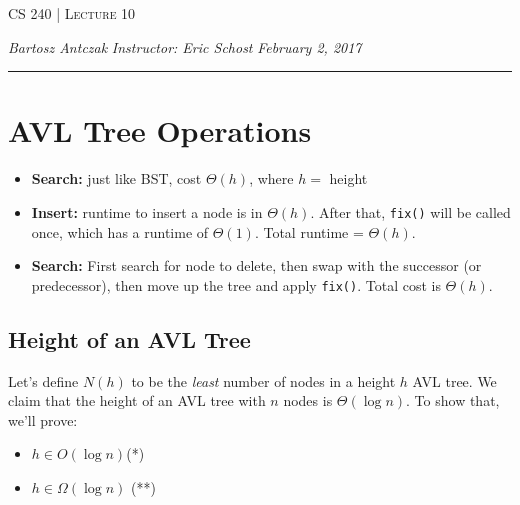 \documentclass{report}
\newcommand{\lectureNum}{10}
\newcommand{\curDate}{February 2, 2017}
\newcommand{\course}{CS 240}
\begin{document}
\begin{center}
\begin{Large}
\textsc{\course{} | Lecture \lectureNum{}}
\end{Large}
\end{center} 
\noindent \textit{Bartosz Antczak} \hfill
\textit{Instructor: Eric Schost} \hfill
\textit{\curDate{}}
\rule{\textwidth}{0.4pt}

\section{AVL Tree Operations}
\begin{itemize}
\item \textbf{Search:} just like BST, cost $\Theta(h)$, where $h = $ height
\item \textbf{Insert:} runtime to insert a node is in $\Theta(h)$. After that, \texttt{fix()} will be called once, which has a runtime of $\Theta(1)$. Total runtime = $\Theta(h)$.
\item \textbf{Search:} First search for node to delete, then swap with the successor (or predecessor), then move up the tree and apply \texttt{fix()}. Total cost is $\Theta(h)$.
\end{itemize}
\subsection{Height of an AVL Tree}
Let's define $N(h)$ to be the \textit{least} number of nodes in a height $h$ AVL tree. We claim that the height of an AVL tree with $n$ nodes is $\Theta(\log n)$. To show that, we'll prove:
\begin{itemize}
\item $h \in O(\log n)$(*)
\item $h \in \Omega(\log n)$ (**)
\end{itemize}
\end{document}
